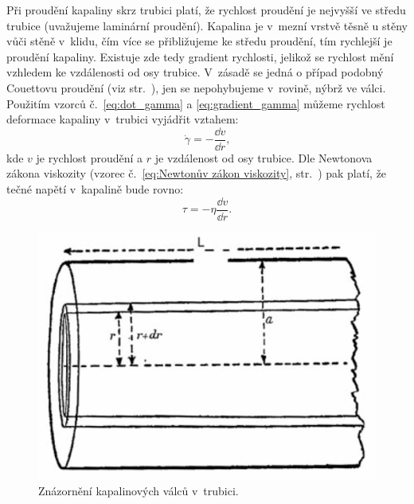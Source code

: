 \documentclass[12pt]{article}
\begin{document}
Při proudění kapaliny skrz trubici platí, že rychlost proudění je nejvyšší ve středu trubice (uvažujeme laminární proudění). Kapalina je v~mezní vrstvě těsně u stěny vůči stěně v~klidu, čím více se přibližujeme ke středu proudění, tím rychlejší je proudění kapaliny. Existuje zde tedy gradient rychlosti, jelikož se rychlost mění vzhledem ke vzdálenosti od osy trubice. V~zásadě se jedná o případ podobný Couettovu proudění (viz str.~\pageref{sec:Couettovo_proudění}), jen se nepohybujeme v~rovině, nýbrž ve válci. Použitím vzorců č.~\ref{eq:dot_gamma} a \ref{eq:gradient_gamma} můžeme rychlost deformace kapaliny v~trubici vyjádřit vztahem:~\cite{book:Calibration_of_viscometers}
\begin{equation}
    \dot\gamma = -\frac{\dd v}{\dd r}\text{,}
    \label{eq:gamma_gradient}
\end{equation}
kde $v$ je rychlost proudění a $r$ je vzdálenost od osy trubice. Dle Newtonova zákona viskozity (vzorec č.~\ref{eq:Newtonův zákon viskozity}, str.~\pageref{eq:Newtonův zákon viskozity}) pak platí, že tečné napětí v~kapalině bude rovno:~\cite{book:Calibration_of_viscometers}
\begin{equation}
    \tau = -\eta\frac{\dd v}{\dd r}\text{.}
\end{equation}

\begin{figure}
    \centering
    \includegraphics[width=0.5\linewidth]{figures/valce_kapaliny.png}
    \caption{Znázornění kapalinových válců v~trubici.~\cite{book:Calibration_of_viscometers}}
    \label{fig:valce}
\end{figure}
\end{document}
